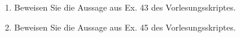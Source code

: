 
\begin{exercise}

\phantom{}

\begin{enumerate}[label = \textbf{\alph*)}]
  \item Beweisen Sie die Aussage aus Ex. 43 des Vorlesungsskriptes.
  \item Beweisen Sie die Aussage aus Ex. 45 des Vorlesungsskriptes.
\end{enumerate}

\end{exercise}


